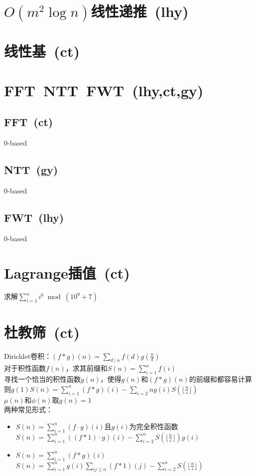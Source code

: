 \section{$ O(m ^ 2 \log n) $线性递推\ \small(lhy)}
\section{线性基\ \small(ct)}
\section{FFT\ NTT\ FWT\ \small(lhy,ct,gy)}
	\subsection*{FFT\ \small(ct)}
		$ 0 $-based
	\subsection*{NTT\ \small(gy)}
		$ 0 $-based
	\subsection*{FWT\ \small(lhy)}
		$ 0 $-based
\section{Lagrange插值\ \small(ct)}
	求解$ \sum\limits_{i = 1}^{n} i^k \bmod (10^9 + 7)$
\section{杜教筛\ \small(ct)}
	Dirichlet卷积：$ (f \ast g) (n) = \sum\limits_{d \mid n}^{} f(d) g(\frac{n}{d}) $
	\\对于积性函数$ f(n) $，求其前缀和$ S(n) = \sum\limits_{i = 1}^{n} f(i) $
	\\寻找一个恰当的积性函数$ g(n) $，使得$ g(n) $和$ (f \ast g) (n) $的前缀和都容易计算
	\\则$ g(1) S(n) = \sum\limits_{i = 1}^{n} (f \ast g) (i) - \sum\limits_{i = 2}{n} g(i) S(\lfloor \frac{n}{i} \rfloor) $
	\\$ \mu (n) $和$ \phi (n) $取$ g(n) = 1 $
	\\两种常见形式：
	\begin{itemize}[nosep,wide=0pt]
		\item $ S(n) = \sum\limits_{i = 1}^{n} (f \cdot g) (i) $且$ g(i) $为完全积性函数
			\\$ S(n) = \sum\limits_{i = 1}^{n} ((f \ast 1) \cdot g) (i) - \sum\limits_{i = 2}^{n} S(\lfloor \frac{n}{i} \rfloor) g(i) $
		\item $ S(n) = \sum\limits_{i = 1}^{n} (f \ast g) (i) $
			\\$ S(n) = \sum\limits_{i = 1}^{n} g (i) \sum\limits_{ij \leq n}^{} (f \ast 1) (j) - \sum\limits_{i = 2}^{n} S(\lfloor \frac{n}{i} \rfloor) $
	\end{itemize}
